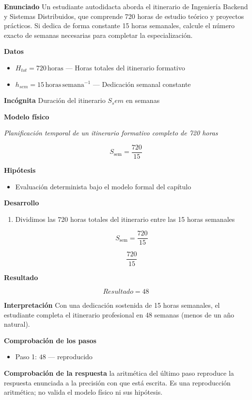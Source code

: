 \documentclass{book}
\begin{document}
\begin{tcolorbox}[title={Problema resuelto}, studiumworked, breakable]

\noindent\textbf{Enunciado}
Un estudiante autodidacta aborda el itinerario de Ingeniería Backend y Sistemas Distribuidos, que comprende 720 horas de estudio teórico y proyectos prácticos. Si dedica de forma constante 15 horas semanales, calcule el número exacto de semanas necesarias para completar la especialización.

\noindent\textbf{Datos}
\begin{itemize}
\item $H_{tot} = 720\,\mathrm{horas}$ — Horas totales del itinerario formativo
\item $h_{sem} = 15\,\mathrm{horas}\,\mathrm{semana}^{-1}$ — Dedicación semanal constante
\end{itemize}

\noindent\textbf{Incógnita}
Duración del itinerario \(S_sem\) en semanas

\noindent\textbf{Modelo físico}

\noindent\textit{Planificación temporal de un itinerario formativo completo de 720 horas}

\[
S_{\text{sem}} = \frac{720}{15}
\]

\noindent\textbf{Hipótesis}
\begin{itemize}
\item Evaluación determinista bajo el modelo formal del capítulo
\end{itemize}

\noindent\textbf{Desarrollo}
\begin{enumerate}
\item
Dividimos las 720 horas totales del itinerario entre las 15 horas semanales

\[
S_{\text{sem}} = \frac{720}{15}
\]

\[
\frac{720}{15}
\]
\end{enumerate}

\noindent\textbf{Resultado}

\[
Resultado = 48
\]

\noindent\textbf{Interpretación}
Con una dedicación sostenida de 15 horas semanales, el estudiante completa el itinerario profesional en 48 semanas (menos de un año natural).

\noindent\textbf{Comprobación de los pasos}
\begin{itemize}
\item Paso 1: $48$ — reproducido
\end{itemize}

\noindent\textbf{Comprobación de la respuesta} la aritmética del último paso reproduce la respuesta enunciada a la precisión con que está escrita. Es una reproducción aritmética; no valida el modelo físico ni sus hipótesis.
\end{tcolorbox}
\end{document}
